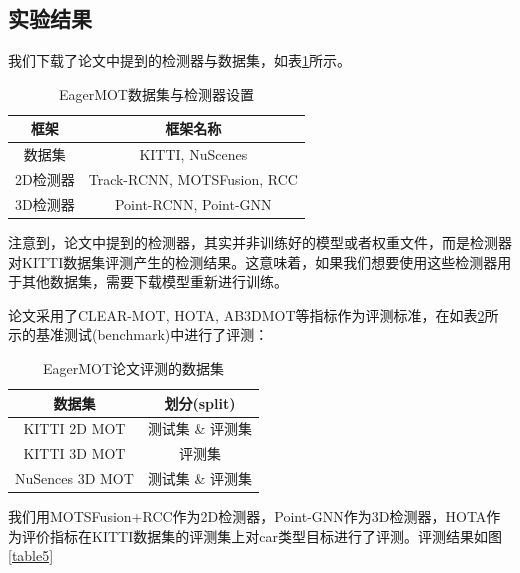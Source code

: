 \subsection{实验结果}

我们下载了论文中提到的检测器与数据集，如表\ref{table3}所示。

\begin{table}[htbp]
    \centering
    \caption{EagerMOT数据集与检测器设置}
    \begin{tabular}{c c}
    \toprule
    框架 & 框架名称 \\
    \midrule
    数据集 & KITTI, NuScenes\\
    2D检测器 & Track-RCNN, MOTSFusion, RCC\\
    3D检测器 & Point-RCNN, Point-GNN\\
    \bottomrule
    \end{tabular}
    \label{table3}
\end{table}

注意到，论文中提到的检测器，其实并非训练好的模型或者权重文件，而是检测器对KITTI数据集评测产生的检测结果。这意味着，如果我们想要使用这些检测器用于其他数据集，需要下载模型重新进行训练。

论文采用了CLEAR-MOT, HOTA, AB3DMOT等指标作为评测标准，在如表\ref{table4}所示的基准测试(benchmark)中进行了评测：

\begin{table}[htbp]
    \centering
    \caption{EagerMOT论文评测的数据集}
    \begin{tabular}{c c}
    \toprule
    数据集 & 划分(split) \\
    \midrule
    KITTI 2D MOT & 测试集 \& 评测集\\
    KITTI 3D MOT & 评测集 \\
    NuSences 3D MOT & 测试集 \& 评测集\\
    \bottomrule
    \end{tabular}
    \label{table4}
\end{table}

我们用MOTSFusion+RCC作为2D检测器，Point-GNN作为3D检测器，HOTA作为评价指标在KITTI数据集的评测集上对car类型目标进行了评测。评测结果如图\ref{table5}

